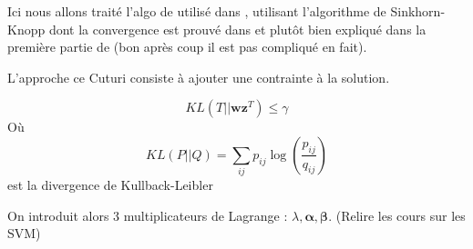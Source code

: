 
Ici nous allons traité l'algo de \cite{Cuturi2013} utilisé dans \cite{Courty2014},
\cite{Courty2015} utilisant 
l'algorithme de Sinkhorn-Knopp dont la convergence est prouvé dans \cite{Sinkhorn1967} et 
plutôt bien expliqué dans la première partie de \cite{Knight2008} 
(bon après coup il est pas compliqué en fait).


L'approche ce Cuturi consiste à ajouter une contrainte à la solution.

\begin{equation}
KL(T||\mathbf{wz}^T ) \leq \gamma
\end{equation}
Où
\begin{equation}
KL(P||Q) = \sum_{ij} p_{ij} \log(\frac{p_{ij}}{q_{ij}} )
\end{equation}
est la divergence de Kullback-Leibler

On introduit alors 3 multiplicateurs de Lagrange : $\lambda, \boldsymbol\alpha, \boldsymbol\beta$.
(Relire les cours sur les SVM)

